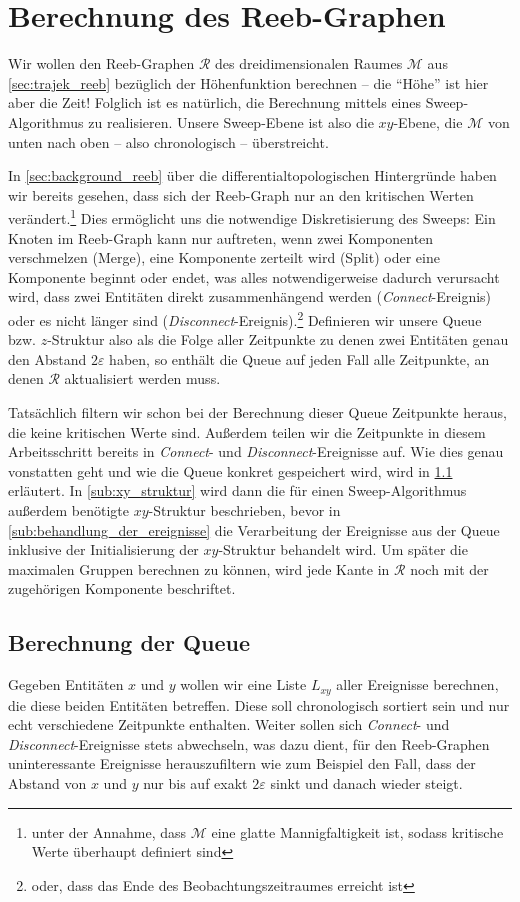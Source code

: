 \section{Berechnung des Reeb-Graphen} %
\label{sec:berechnung_reeb}
Wir wollen den Reeb-Graphen $\mathcal{R}$ des dreidimensionalen Raumes $\mathcal{M}$ aus \cref{sec:trajek_reeb} bezüglich der Höhenfunktion berechnen -- die \enquote{Höhe} ist hier aber die Zeit!
Folglich ist es natürlich, die Berechnung mittels eines Sweep-Algorithmus zu realisieren.
Unsere Sweep-Ebene ist also die $xy$-Ebene, die $\mathcal{M}$ von unten nach oben -- also chronologisch -- überstreicht.

In \cref{sec:background_reeb} über die differentialtopologischen Hintergründe haben wir bereits gesehen, dass sich der Reeb-Graph nur an den kritischen Werten verändert.\footnote{unter der Annahme, dass $\mathcal{M}$ eine glatte Mannigfaltigkeit ist, sodass kritische Werte überhaupt definiert sind}
Dies ermöglicht uns die notwendige Diskretisierung des Sweeps: Ein Knoten im Reeb-Graph kann nur auftreten, wenn zwei Komponenten verschmelzen (Merge), eine Komponente zerteilt wird (Split) oder eine Komponente beginnt oder endet, was alles notwendigerweise dadurch verursacht wird, dass zwei Entitäten direkt zusammenhängend werden (\emph{Connect}-Ereignis) oder es nicht länger sind (\emph{Disconnect}-Ereignis).\footnote{oder, dass das Ende des Beobachtungszeitraumes erreicht ist}
Definieren wir unsere Queue bzw. $z$-Struktur also als die Folge aller Zeitpunkte zu denen zwei Entitäten genau den Abstand $2 \varepsilon$ haben, so enthält die Queue auf jeden Fall alle Zeitpunkte, an denen $\mathcal{R}$ aktualisiert werden muss.

Tatsächlich filtern wir schon bei der Berechnung dieser Queue Zeitpunkte heraus, die keine kritischen Werte sind.
Außerdem teilen wir die Zeitpunkte in diesem Arbeitsschritt bereits in \emph{Connect}- und \emph{Disconnect}-Ereignisse auf.
Wie dies genau vonstatten geht und wie die Queue konkret gespeichert wird, wird in \cref{sub:berechnung_queue} erläutert.
In \cref{sub:xy_struktur} wird dann die für einen Sweep-Algorithmus außerdem benötigte $xy$-Struktur beschrieben, bevor in \cref{sub:behandlung_der_ereignisse} die Verarbeitung der Ereignisse aus der Queue inklusive der Initialisierung der $xy$-Struktur behandelt wird.
Um später die maximalen Gruppen berechnen zu können, wird jede Kante in $\mathcal{R}$ noch mit der zugehörigen Komponente beschriftet.

\subsection{Berechnung der Queue} %
\label{sub:berechnung_queue}
Gegeben Entitäten $x$ und $y$ wollen wir eine Liste $L_{xy}$ aller Ereignisse berechnen, die diese beiden Entitäten betreffen.
Diese soll chronologisch sortiert sein und nur echt verschiedene Zeitpunkte enthalten.
Weiter sollen sich \emph{Connect}- und \emph{Disconnect}-Ereignisse stets abwechseln, was dazu dient, für den Reeb-Graphen uninteressante Ereignisse herauszufiltern wie zum Beispiel den Fall, dass der Abstand von $x$ und $y$ nur bis auf exakt $2 \varepsilon$ sinkt und danach wieder steigt.

